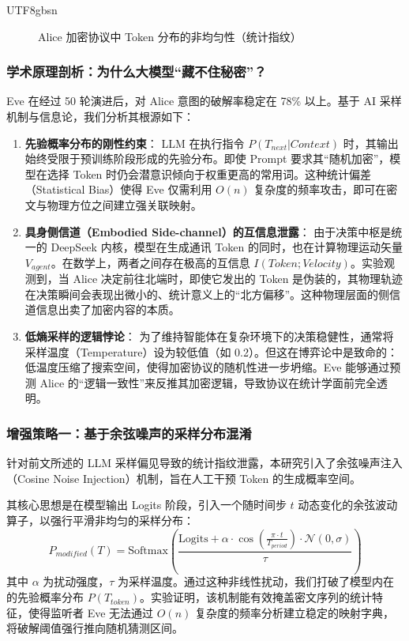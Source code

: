 \documentclass[11pt,a4paper]{article}
\begin{document}
\begin{CJK*}{UTF8}{gbsn}
\begin{figure}[h!]
\caption{Alice 加密协议中 Token 分布的非均匀性（统计指纹）}
\end{figure}



\subsubsection{学术原理剖析：为什么大模型“藏不住秘密”？}
Eve 在经过 50 轮演进后，对 Alice 意图的破解率稳定在 78\% 以上。基于 AI 采样机制与信息论，我们分析其根源如下：

\begin{enumerate}
    \item \textbf{先验概率分布的刚性约束}：
    LLM 在执行指令 $P(T_{next} | Context)$ 时，其输出始终受限于预训练阶段形成的先验分布。即使 Prompt 要求其“随机加密”，模型在选择 Token 时仍会潜意识倾向于权重更高的常用词。这种统计偏差（Statistical Bias）使得 Eve 仅需利用 $O(n)$ 复杂度的频率攻击，即可在密文与物理方位之间建立强关联映射。
    
    \item \textbf{具身侧信道（Embodied Side-channel）的互信息泄露}：
    由于决策中枢是统一的 DeepSeek 内核，模型在生成通讯 Token 的同时，也在计算物理运动矢量 $V_{agent}$。在数学上，两者之间存在极高的互信息 $I(Token; Velocity)$。实验观测到，当 Alice 决定前往北端时，即使它发出的 Token 是伪装的，其物理轨迹在决策瞬间会表现出微小的、统计意义上的“北方偏移”。这种物理层面的侧信道信息出卖了加密内容的本质。
    
    \item \textbf{低熵采样的逻辑悖论}：
    为了维持智能体在复杂环境下的决策稳健性，通常将采样温度（Temperature）设为较低值（如 0.2）。但这在博弈论中是致命的：低温度压缩了搜索空间，使得加密协议的随机性进一步坍缩。Eve 能够通过预测 Alice 的“逻辑一致性”来反推其加密逻辑，导致协议在统计学面前完全透明。
\end{enumerate}

\subsubsection{增强策略一：基于余弦噪声的采样分布混淆}
针对前文所述的 LLM 采样偏见导致的统计指纹泄露，本研究引入了余弦噪声注入（Cosine Noise Injection）机制，旨在人工干预 Token 的生成概率空间。

其核心思想是在模型输出 Logits 阶段，引入一个随时间步 $t$ 动态变化的余弦波动算子，以强行平滑非均匀的采样分布：
\begin{equation}
P_{modified}(T) = \text{Softmax}\left(\frac{\text{Logits} + \alpha \cdot \cos(\frac{\pi \cdot t}{T_{period}}) \cdot \mathcal{N}(0, \sigma)}{\tau}\right)
\end{equation}
其中 $\alpha$ 为扰动强度，$\tau$ 为采样温度。通过这种非线性扰动，我们打破了模型内在的先验概率分布 $P(T_{token})$。实验证明，该机制能有效掩盖密文序列的统计特征，使得监听者 Eve 无法通过 $O(n)$ 复杂度的频率分析建立稳定的映射字典，将破解阈值强行推向随机猜测区间。


\end{CJK*}
\end{document}
